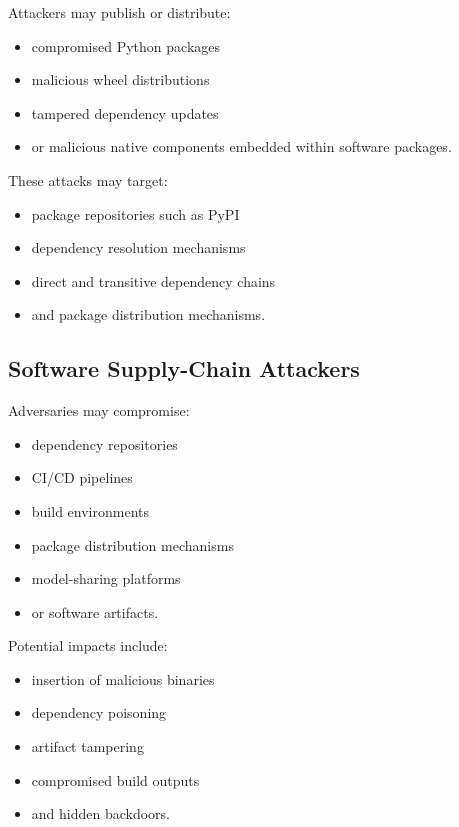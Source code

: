 \documentclass[
  12pt,
  letterpaper,
  oneside]{report}
\providecommand{\tightlist}{%
  \setlength{\itemsep}{0pt}\setlength{\parskip}{0pt}}
\begin{document}
Attackers may publish or distribute:

\begin{itemize}
\tightlist
\item
  compromised Python packages
\item
  malicious wheel distributions
\item
  tampered dependency updates
\item
  or malicious native components embedded within software packages.
\end{itemize}

These attacks may target:

\begin{itemize}
\tightlist
\item
  package repositories such as PyPI
\item
  dependency resolution mechanisms
\item
  direct and transitive dependency chains
\item
  and package distribution mechanisms.
\end{itemize}

\subsection{Software Supply-Chain Attackers}\label{632-software-supply-chain-attackers}

Adversaries may compromise:

\begin{itemize}
\tightlist
\item
  dependency repositories
\item
  CI/CD pipelines
\item
  build environments
\item
  package distribution mechanisms
\item
  model-sharing platforms
\item
  or software artifacts.
\end{itemize}

Potential impacts include:

\begin{itemize}
\tightlist
\item
  insertion of malicious binaries
\item
  dependency poisoning
\item
  artifact tampering
\item
  compromised build outputs
\item
  and hidden backdoors.
\end{itemize}
\end{document}
